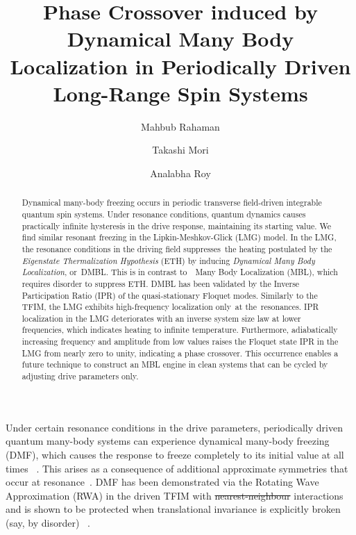 \documentclass[%
reprint,
superscriptaddress,
amsmath,amssymb,
aps,
prb,
showkeys,
]{revtex4-2}
\providecommand{\DIFaddtex}[1]{{\protect\color{blue}\uwave{#1}}} %
\providecommand{\DIFdeltex}[1]{{\protect\color{red}\sout{#1}}}                      %
\providecommand{\DIFaddbegin}{} %
\providecommand{\DIFaddend}{} %
\providecommand{\DIFdelbegin}{} %
\providecommand{\DIFdelend}{} %
\providecommand{\DIFadd}[1]{\texorpdfstring{\DIFaddtex{#1}}{#1}} %
\providecommand{\DIFdel}[1]{\texorpdfstring{\DIFdeltex{#1}}{}} %
\newcommand{\DIFscaledelfig}{0.5}
\newlength{\DIFdelgraphicswidth} %
\newlength{\DIFdelgraphicsheight} %
\newcommand{\DIFaddincludegraphics}[2][]{{\color{blue}\fbox{\DIFOincludegraphics[#1]{#2}}}} %
\newcommand{\DIFdelincludegraphics}[2][]{%
\sbox{\DIFdelgraphicsbox}{\DIFOincludegraphics[#1]{#2}}%
\settoboxwidth{\DIFdelgraphicswidth}{\DIFdelgraphicsbox} %
\settoboxtotalheight{\DIFdelgraphicsheight}{\DIFdelgraphicsbox} %
\scalebox{\DIFscaledelfig}{%
\parbox[b]{\DIFdelgraphicswidth}{\usebox{\DIFdelgraphicsbox}\\[-\baselineskip] \rule{\DIFdelgraphicswidth}{0em}}\llap{\resizebox{\DIFdelgraphicswidth}{\DIFdelgraphicsheight}{%
\setlength{\unitlength}{\DIFdelgraphicswidth}%
\begin{picture}(1,1)%
\thicklines\linethickness{2pt} %
{\color[rgb]{1,0,0}\put(0,0){\framebox(1,1){}}}%
{\color[rgb]{1,0,0}\put(0,0){\line( 1,1){1}}}%
{\color[rgb]{1,0,0}\put(0,1){\line(1,-1){1}}}%
\end{picture}%
}\hspace*{3pt}}} %
} %
\DeclareRobustCommand{\DIFaddbegin}{\DIFOaddbegin \let\includegraphics\DIFaddincludegraphics} %
\DeclareRobustCommand{\DIFaddend}{\DIFOaddend \let\includegraphics\DIFOincludegraphics} %
\DeclareRobustCommand{\DIFdelbegin}{\DIFOdelbegin \let\includegraphics\DIFdelincludegraphics} %
\DeclareRobustCommand{\DIFdelend}{\DIFOaddend \let\includegraphics\DIFOincludegraphics} %
\begin{document}

\title{Phase Crossover induced by Dynamical Many Body Localization in Periodically Driven Long-Range Spin Systems}

\author{Mahbub Rahaman}
\author{Takashi Mori}
\author{Analabha Roy}


\begin{abstract}
	Dynamical many-body freezing occurs in periodic transverse field-driven integrable quantum spin systems. Under resonance conditions, quantum dynamics causes practically infinite hysteresis in the drive response, maintaining its starting value. We find similar resonant freezing in the Lipkin-Meshkov-Glick (LMG) model. In the LMG, the resonance conditions in the driving field suppresses the heating postulated by the \textit{Eigenstate Thermalization Hypothesis} (ETH)		
	by inducing \textit{Dynamical Many Body Localization}, or DMBL. This is in contrast to  Many Body Localization (MBL), which requires disorder to suppress ETH. DMBL has been validated by the Inverse Participation Ratio (IPR) of the quasi-stationary Floquet modes. Similarly to the TFIM, the LMG exhibits high-frequency localization only at the resonances. IPR localization in the LMG deteriorates with an inverse system size law at lower frequencies, which indicates heating to infinite temperature. Furthermore, adiabatically increasing frequency and amplitude from low values raises the Floquet state IPR in the LMG from nearly zero to unity, indicating a phase crossover. This occurrence enables a future technique to construct an MBL engine in clean systems that can be cycled by adjusting drive parameters only.
\end{abstract}

\maketitle

\DIFdelbegin %
\DIFdelend Under certain resonance conditions in the drive parameters, periodically driven quantum many-body systems can experience dynamical many-body freezing (DMF), which causes the response to freeze completely to its initial value at all times\DIFdelbegin %
\DIFdelend ~\cite{bordia_periodically_2017, sahoo_periodically_2019, das_exotic_2010}. This arises as a consequence of additional approximate symmetries that occur at resonance~\cite{asmi:scars}. DMF has been demonstrated via the Rotating Wave Approximation (RWA) in the driven TFIM with \DIFdelbegin \DIFdel{nearest-neighbour }\DIFdelend \DIFaddbegin \DIFadd{nearest-neighbor }\DIFaddend interactions ~\cite{mbeng_quantum_2020} and is shown to be protected when translational invariance is explicitly broken (say, by disorder) ~\cite{yamada_localization_2022, roy_fate_2015}. 
\end{document}
